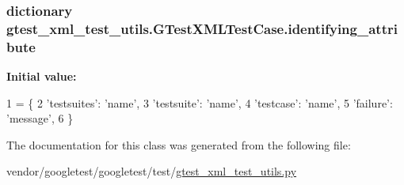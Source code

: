 \subsubsection[{\texorpdfstring{identifying\+\_\+attribute}{identifying_attribute}}]{\setlength{\rightskip}{0pt plus 5cm}dictionary gtest\+\_\+xml\+\_\+test\+\_\+utils.\+G\+Test\+X\+M\+L\+Test\+Case.\+identifying\+\_\+attribute\hspace{0.3cm}{\ttfamily [static]}}\hypertarget{classgtest__xml__test__utils_1_1GTestXMLTestCase_a0e3a4e84e18f29d2248dcd670a0a6ae6}{}\label{classgtest__xml__test__utils_1_1GTestXMLTestCase_a0e3a4e84e18f29d2248dcd670a0a6ae6}
{\bfseries Initial value\+:}
\begin{DoxyCode}
1 = \{
2     \textcolor{stringliteral}{'testsuites'}: \textcolor{stringliteral}{'name'},
3     \textcolor{stringliteral}{'testsuite'}: \textcolor{stringliteral}{'name'},
4     \textcolor{stringliteral}{'testcase'}:  \textcolor{stringliteral}{'name'},
5     \textcolor{stringliteral}{'failure'}:   \textcolor{stringliteral}{'message'},
6     \}
\end{DoxyCode}


The documentation for this class was generated from the following file\+:\begin{DoxyCompactItemize}
\item 
vendor/googletest/googletest/test/\hyperlink{gtest__xml__test__utils_8py}{gtest\+\_\+xml\+\_\+test\+\_\+utils.\+py}\end{DoxyCompactItemize}
